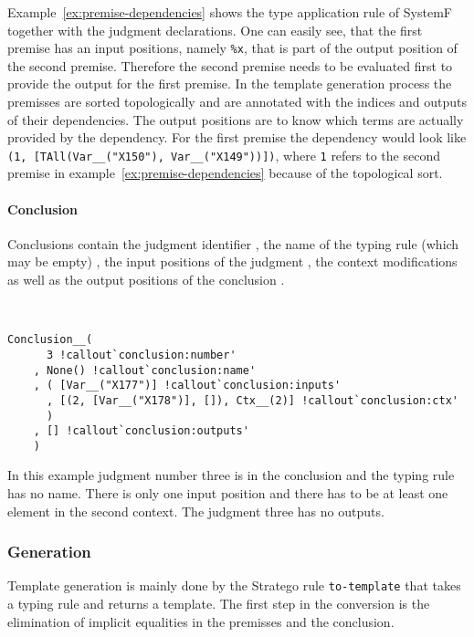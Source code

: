 Example~\ref{ex:premise-dependencies} shows the type application rule
of SystemF  together with the judgment
declarations. One can easily see, that the first premise has an input
positions, namely \verb|%x|, that is part of the output position of
the second premise. Therefore the second premise needs to be evaluated
first to provide the output for the first premise. In the template
generation process the premisses are sorted topologically and are
annotated with the indices and outputs of their dependencies. The
output positions are to know which terms are actually provided by the
dependency. For the first premise the dependency would look like
\verb|(1, [TAll(Var__("X150"), Var__("X149"))])|, where \verb|1|
refers to the second premise in example~\ref{ex:premise-dependencies}
because of the topological sort.

\paragraph{Conclusion}
Conclusions contain the judgment identifier
, the name of the typing rule (which may
be empty) , the input positions of the
judgment , the context modifications
 as well as the output positions of the
conclusion .

\begin{example}{~}
\begin{verbatim}
Conclusion__(
      3 !callout`conclusion:number'
    , None() !callout`conclusion:name'
    , ( [Var__("X177")] !callout`conclusion:inputs'
      , [(2, [Var__("X178")], []), Ctx__(2)] !callout`conclusion:ctx'
      )
    , [] !callout`conclusion:outputs'
    )
\end{verbatim}
\end{example}

In this example judgment number three is in the conclusion and the
typing rule has no name. There is only one input position and there
has to be at least one element in the second context. The judgment
three has no outputs.

\subsubsection{Generation}
Template generation is mainly done by the Stratego rule
\verb|to-template| that takes a typing rule and returns a
template. The first step in the conversion is the elimination of
implicit equalities in the premisses and the conclusion.

